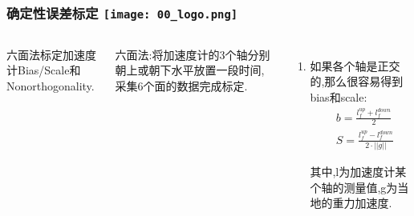 
\begin{comment}
\end{comment}
\begin{frame}
\frametitle{确定性误差标定 \hfill \texttt{[image: 00\_logo.png]}}
\begin{columns}
  
  六面法标定加速度计Bias/Scale和Nonorthogonality.

  六面法:将加速度计的3个轴分别朝上或朝下水平放置一段时间,采集6个面的数据完成标定.
	\begin{enumerate}
		\item 如果各个轴是正交的,那么很容易得到bias和scale:
		\begin{equation}
      \begin{split}
          &b = \frac{l^{up}_f + l^{down}_f}{2} \\
          & S = \frac{l^{up}_f - l^{down}_f}{2 \cdot ||g||}
      \end{split}
    \end{equation}

    其中,l为加速度计某个轴的测量值,g为当地的重力加速度.

  \end{enumerate}
  
  

\end{columns}
\end{frame}



